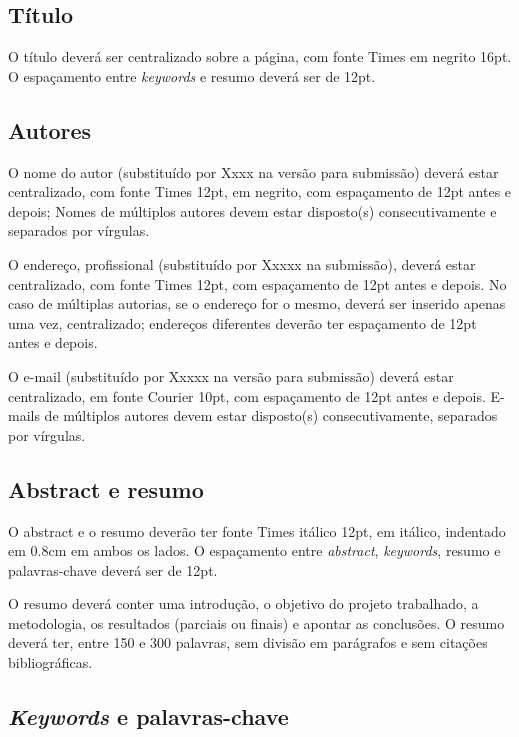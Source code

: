 \documentclass[12pt]{article}
\begin{document}
\subsection{Título}
\label{sec:titulo}

O título deverá ser centralizado sobre a página, com fonte Times em
negrito 16pt. O espaçamento entre \textit{keywords} e resumo deverá
ser de 12pt.

\subsection{Autores}
\label{sec:autores}

O nome do autor (substituído por Xxxx na versão para submissão) deverá
 estar centralizado, com fonte Times 12pt, em negrito, com espaçamento
de 12pt antes e depois; Nomes de múltiplos autores devem estar disposto(s)
 consecutivamente e separados por vírgulas.

O endereço, profissional (substituído por Xxxxx na submissão), deverá
estar centralizado, com fonte Times 12pt, com espaçamento de 12pt antes
 e depois. No caso de múltiplas autorias, se o endereço for o mesmo,
 deverá ser inserido apenas uma vez, centralizado; endereços diferentes
 deverão ter espaçamento de 12pt antes e depois.

O e-mail (substituído por Xxxxx na versão para submissão) deverá estar
 centralizado, em fonte Courier 10pt, com espaçamento de 12pt antes e
depois. E-mails de múltiplos autores devem estar disposto(s) consecutivamente,
separados por vírgulas.


\subsection{Abstract e resumo}
\label{sec:abstract-e-resumo}

O abstract e o resumo deverão ter fonte Times itálico 12pt, em
itálico, indentado em 0.8cm em ambos os lados. O espaçamento entre
\textit{abstract}, \textit{keywords}, resumo e palavras-chave deverá
ser de 12pt.

O resumo deverá conter uma introdução, o objetivo do projeto
trabalhado, a metodologia, os resultados (parciais ou finais) e
apontar as conclusões. O resumo deverá ter, entre 150 e 300 palavras,
sem divisão em parágrafos e sem citações bibliográficas.

\subsection{\textit{Keywords} e palavras-chave}
\label{sec:keywords-e-palavras}
\end{document}
